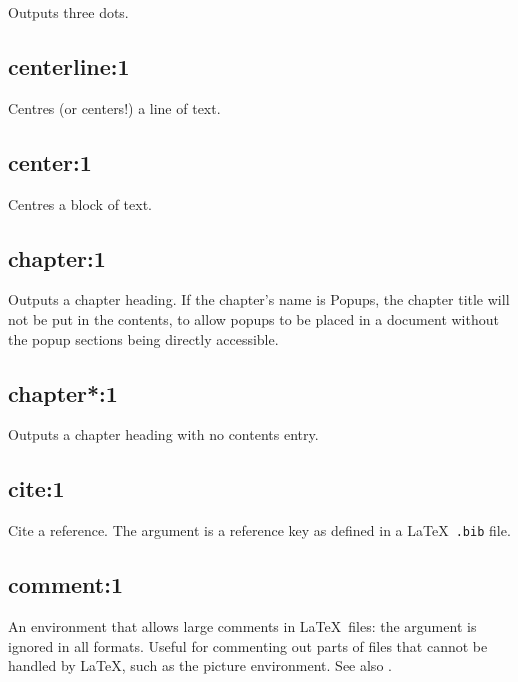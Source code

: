 Outputs three dots.

\subsection*{centerline:1}\label{centerline}

Centres (or centers!) a line of text.

\subsection*{center:1}\label{center}

Centres a block of text.

\subsection*{chapter:1}\label{chapter}

Outputs a chapter heading. If the chapter's name is Popups, the chapter title will not be
put in the contents, to allow popups to be placed in a document without the popup
sections being directly accessible.

\subsection*{chapter*:1}\label{chaptersX}

Outputs a chapter heading with no contents entry.

\subsection*{cite:1}\label{cite}

Cite a reference. The argument is a reference key as defined in a \LaTeX\ {\tt .bib}\rtfsp
file.

\subsection*{comment:1}\label{comment}

An environment that allows large comments in \LaTeX\ files: the argument
is ignored in all formats. Useful for commenting out parts of files that
cannot be handled by \LaTeX, such as the picture environment. See also\rtfsp
{}.

